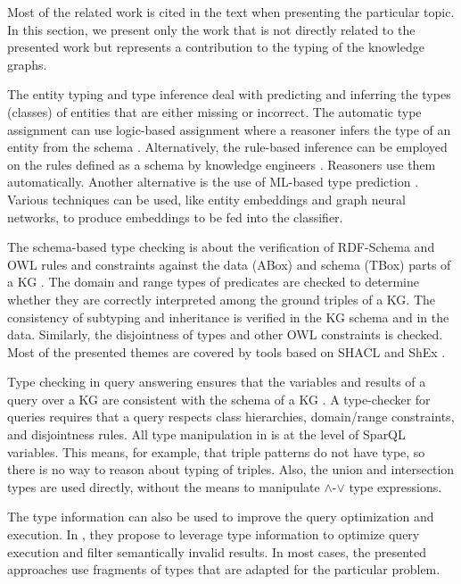 \documentclass[runningheads]{llncs}
\begin{document}
Most of the related work is cited in the text when presenting the
particular topic. In this section, we present only the work that is not
directly related to the presented work but represents a contribution
to the typing of the knowledge graphs.

The entity typing and type inference deal with predicting and
inferring the types (classes) of entities that are either missing or
incorrect. The automatic type assignment can use logic-based
assignment where a reasoner infers the type of an entity from the
schema \cite{Horrocks2003}. Alternatively, the rule-based inference
can be employed on the rules defined as a schema by knowledge
engineers \cite{Horrocks2004}. Reasoners use them
automatically. Another alternative is the use of ML-based type
prediction \cite{Yaghoobzadeh2018}. Various techniques can be used,
like entity embeddings and graph neural networks, to produce
embeddings to be fed into the classifier.

The schema-based type checking is about the verification of RDF-Schema
\cite{rdfschema12} and OWL \cite{owl2} rules and constraints against
the data (ABox) and schema (TBox) parts of a KG
\cite{Baader2002,Horrocks2003,OWL2Spec2012}. The domain and range
types of predicates are checked to determine whether they are correctly interpreted
among the ground triples of a KG. The consistency of subtyping and
inheritance is verified in the KG schema and in the data. Similarly,
the disjointness of types and other OWL constraints is
checked. Most of the presented themes are covered by tools based on
SHACL \cite{shacl2017} and ShEx \cite{shex2015}.

Type checking in query answering ensures that the variables and
results of a query over a KG are consistent with the schema of a KG
\cite{Zhao2017,Zhang2019}. A type-checker for queries requires that a
query respects class hierarchies, domain/range constraints, and
disjointness rules. All type manipulation in \cite{Zhao2017,Zhang2019}
is at the level of SparQL \cite{sparql} variables. This means, for
example, that triple patterns do not have type, so there is no way to
reason about typing of triples. Also, the union and intersection types
are used directly, without the means to manipulate $\land$-$\lor$ type
expressions.

The type information can also be used to improve the query
optimization and execution. In \cite{Kollia2013}, they propose to
leverage type information to optimize query execution and filter
semantically invalid results. In most cases, the presented approaches
use fragments of types that are adapted for the particular problem.
\end{document}
